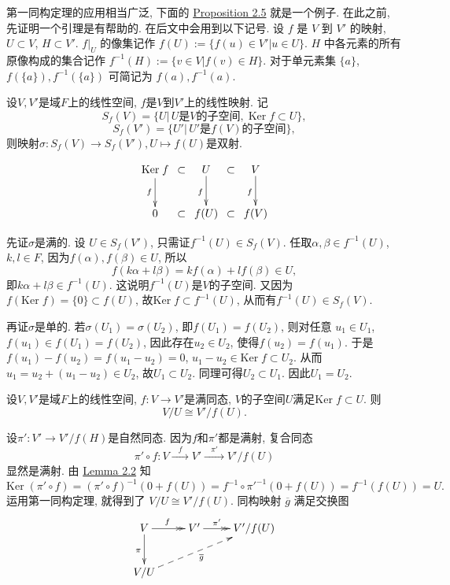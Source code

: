 \documentclass[color=green,mathpazo,titlestyle=hang]{elegantbook}
\begin{document}
第一同构定理的应用相当广泛, 下面的 \hyperlink{Proposition 2.5}{Proposition 2.5} 就是一个例子. 在此之前, 先证明一个引理是有帮助的. 在后文中会用到以下记号. 设 $f$ 是 $V$ 到 $V'$ 的映射, $U\subset V$, $H\subset V'$. $f|_U$ 的像集记作 $f(U):=\{f(u)\in V'|u\in U\}$. $H$ 中各元素的所有原像构成的集合记作 $f^{-1}(H):=\{v\in V|f(v)\in H\}$. 对于单元素集 $\{a\}$, $f(\{a\}),f^{-1}(\{a\})$ 可简记为 $f(a),f^{-1}(a)$.

\hypertarget{Lemma 2.2}{}
\begin{newlemma}
	设$V,V'$是域$F$上的线性空间, $f$是$V$到$V'$上的线性映射. 记
	\[
	S_f(V)=\{U|\,U\text{是}V\text{的子空间},\;\mathrm{Ker}\;f\subset U\},	
	\]	
	\[
	S_f(V')=\{U'|\,U'\text{是}f(V)\text{的子空间}\},
	\]
	则映射$\sigma:S_f(V)\rightarrow S_f(V'),U\mapsto f(U)$是双射.
\end{newlemma}


\begin{newproof}
    \[\xymatrix@C=1.8pt{
    	\mathrm{Ker}\;f\ar[d]_{f} & \subset & U\ar[d]_{f} & \subset & V\ar[d]_{f} \\
    	0 & \subset & f(U) & \subset & f(V) 
    }\]		
	
先证$\sigma$是满的. 设 $U\in S_f(V')$, 只需证$f^{-1}(U)\in S_f(V)$. 任取$\alpha,\beta\in f^{-1}(U)$, $k,l\in F$, 因为$f(\alpha),f(\beta)\in U$, 所以
\[
f(k\alpha+l\beta)=kf(\alpha)+lf(\beta)\in U,
\]
即$k\alpha+l\beta\in f^{-1}(U)$. 这说明$f^{-1}(U)$是$V$的子空间. 又因为$f(\mathrm{Ker}\;f)=\{0\}\subset f(U)$, 故$\mathrm{Ker}\;f\subset f^{-1}(U)$, 从而有$f^{-1}(U)\in S_f(V)$.\par
再证$\sigma$是单的. 若$\sigma(U_1)=\sigma(U_2)$, 即$f(U_1)=f(U_2)$, 则对任意 $u_1\in U_1$, $f(u_1)\in f(U_1)=f(U_2)$, 因此存在$u_2\in U_2$, 使得$f(u_2)=f(u_1)$. 于是$f(u_1)-f(u_2)=f(u_1-u_2)=0$,  $u_1-u_2\in\mathrm{Ker}\;f\subset U_2$. 从而$u_1=u_2+(u_1-u_2)\in U_2$,  故$U_1\subset U_2$. 同理可得$U_2\subset U_1$. 因此$U_1=U_2$.	
	
\end{newproof}

	
\hypertarget{Proposition 2.5}{}
\begin{newprop}
	设$V,V'$是域$F$上的线性空间, $f:V\longrightarrow V'$是满同态,  $V$的子空间$U$满足$\mathrm{Ker}\;f\subset U$. 则
	\[
	V/U\cong V'/f(U).
	\]
\end{newprop}

\begin{newproof}
	设$\pi':V'\rightarrow V'/f(H)$是自然同态. 因为$f$和$\pi'$都是满射, 复合同态
	\[ \pi'\circ f:V\xrightarrow{\;\;\; f\;\;\;}V'\xrightarrow{\;\;\;\pi'\;\;\;}V'/f(U)
	\]
	显然是满射. 由 \hyperlink{Lemma 2.2}{Lemma 2.2} 知 
	\[
	\mathrm{Ker}\;(\pi'\circ f)=(\pi'\circ f)^{-1}(0+f(U))= f^{-1}\circ\pi'^{-1}(0+f(U))=f^{-1}(f(U))=U.
	\]
	运用第一同构定理, 就得到了 $V/U\cong V'/f(U)$. 同构映射 $\overline{g}$ 满足交换图
	\[\xymatrix{
		V\ar[d]_{\pi}\ar@{>>}[r]^{f\ } & V'\ar@{>>}[r]^{\pi'\ \quad} & V'/f(U)\\
		V/U \ar@{-->}[urr]_{\overline{g}} &  
	}\]
\end{newproof}
\end{document}
